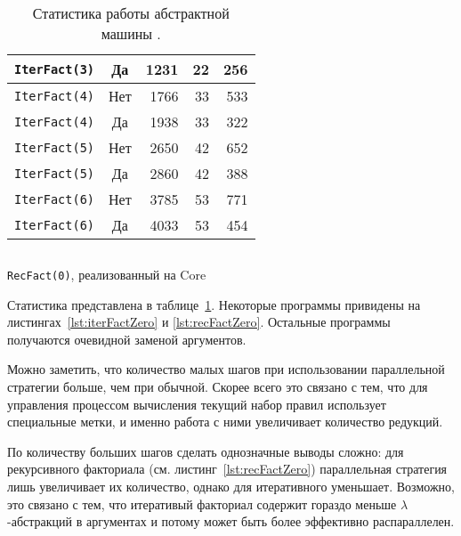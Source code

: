 \begin{table}
\begin{center}
\begin{tabular}{lcrrr}
            \texttt{IterFact(3)}                                           & Да  & 1231 & 22 & 256 \\
            \midrule
            \texttt{IterFact(4)}                                           & Нет & 1766 & 33 & 533 \\
            \texttt{IterFact(4)}                                           & Да  & 1938 & 33 & 322 \\
            \midrule
            \texttt{IterFact(5)}                                           & Нет & 2650 & 42 & 652 \\
            \texttt{IterFact(5)}                                           & Да  & 2860 & 42 & 388 \\
            \midrule
            \texttt{IterFact(6)}                                           & Нет & 3785 & 53 & 771 \\
            \texttt{IterFact(6)}                                           & Да  & 4033 & 53 & 454 \\
            \bottomrule
        \end{tabular}
    \end{center}
    \caption{Статистика работы абстрактной машины \INs{}.}
    \label{table:stats}
\end{table}

\begin{listing}
    \inputminted[fontsize=\footnotesize, breaklines]{ocaml}{figures/recFactZero.lml}
    \caption{\texttt{RecFact(0)}, реализованный на Core}
    \label{lst:recFactZero}
\end{listing}

Статистика представлена в таблице~\ref{table:stats}.
Некоторые программы привидены на листингах~\ref{lst:iterFactZero} и \ref{lst:recFactZero}.
Остальные программы получаются очевидной заменой аргументов.

Можно заметить, что количество малых шагов при использовании параллельной стратегии больше, чем при обычной. Скорее всего это связано с тем, что для управления процессом вычисления текущий набор правил использует специальные метки, и именно работа с ними увеличивает количество редукций.

По количеству больших шагов сделать однозначные выводы сложно: для рекурсивного факториала (см. листинг~\ref{lst:recFactZero}) параллельная стратегия лишь увеличивает их количество, однако для итеративного уменьшает.
Возможно, это связано с тем, что итеративый факториал содержит гораздо меньше $\lambda$-абстракций в аргументах  и потому может быть более эффективно распараллелен.

